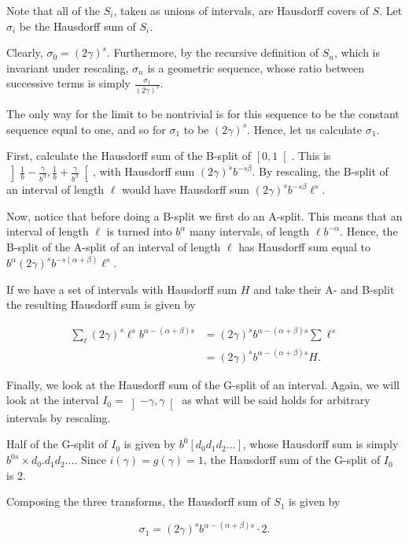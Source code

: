 \documentclass[11pt, reqno]{amsart}
\begin{document}
Note that all of the $S_i$, taken as unions of intervals, are Hausdorff covers of $S$. Let $\sigma_i$ be the Hausdorff sum of $S_i$.

Clearly, $\sigma_0 = (2 \gamma)^s$. Furthermore, by the recursive definition of $S_n$, which is invariant under rescaling, $\sigma_n$ is a geometric sequence, whose ratio between successive terms is simply $\frac{\sigma_1}{(2 \gamma)^s}$.

The only way for the limit to be nontrivial is for this sequence to be the constant sequence equal to one, and so for $\sigma_1$ to be $(2 \gamma)^s$. Hence, let us calculate $\sigma_1$.

First, calculate the Hausdorff sum of the B-split of $\left[0, 1 \right[$. This is $\left] \frac 1 b - \frac \gamma{b^\beta}, \frac 1 b + \frac \gamma{b^\beta} \right[$, with Hausdorff sum $(2 \gamma)^s b^{-s \beta}$. By rescaling, the B-split of an interval of length $\ell$ would have Hausdorff sum $(2 \gamma)^s b^{-s \beta} \ell^s$.

Now, notice that before doing a B-split we first do an A-split. This means that an interval of length $\ell$ is turned into $b^\alpha$ many intervals, of length $\ell b^{-\alpha}$. Hence, the B-split of the A-split of an interval of length $\ell$ has Hausdorff sum equal to $b^\alpha (2 \gamma)^s b^{-s (\alpha + \beta)} \ell^s$.

If we have a set of intervals with Hausdorff sum $H$ and take their A- and B-split the resulting Hausdorff sum is given by

\begin{align*}
\sum_\ell (2 \gamma)^s \ell^s b^{\alpha - (\alpha + \beta) s} &=
(2 \gamma)^s b^{\alpha - (\alpha + \beta) s} \sum \ell^s\\
&= (2 \gamma)^s b^{\alpha - (\alpha + \beta) s} H.
\end{align*}

Finally, we look at the Hausdorff sum of the G-split of an interval. Again, we will look at the interval $I_0 = \left] -\gamma, \gamma \right[$ as what will be said holds for arbitrary intervals by rescaling.

Half of the G-split of $I_0$ is given by $b^0 [ d_0 d_1 d_2 \dots]$, whose Hausdorff sum is simply $b^{0s} \times d_0 . d_1 d_2 \dots$. Since $i(\gamma) = g(\gamma) = 1$, the Hausdorff sum of the G-split of $I_0$ is 2.

Composing the three transforms, the Hausdorff sum of $S_1$ is given by

\[\sigma_1 = (2 \gamma)^s b^{\alpha - (\alpha + \beta) s} \cdot 2.\]
\end{document}
